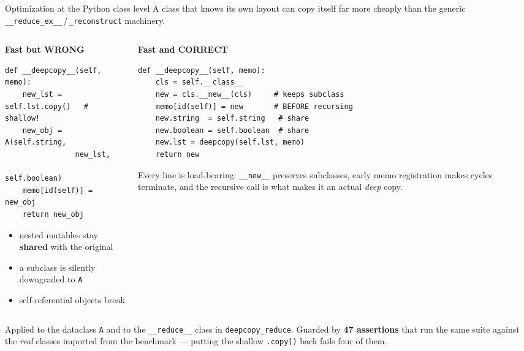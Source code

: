 \documentclass[aspectratio=169,11pt]{beamer}
\begin{document}
\begin{frame}[fragile]{Optimization at the Python class level}
\small
A class that knows its own layout can copy itself far more cheaply than the
generic \texttt{\_\_reduce\_ex\_\_}\,/\,\texttt{\_reconstruct} machinery.
\vspace{2pt}
\begin{columns}[T]
\begin{column}{0.48\textwidth}
\centering\footnotesize\textcolor{bad}{\textbf{Fast but WRONG}}
\begin{lstlisting}[style=py]
def __deepcopy__(self, memo):
    new_lst = self.lst.copy()   # shallow!
    new_obj = A(self.string,
                new_lst,
                self.boolean)
    memo[id(self)] = new_obj
    return new_obj
\end{lstlisting}
\scriptsize
\begin{itemize}\scriptsize
  \item nested mutables stay \textbf{shared} with the original
  \item a subclass is silently downgraded to \texttt{A}
  \item self-referential objects break
\end{itemize}
\end{column}
\begin{column}{0.50\textwidth}
\centering\footnotesize\textcolor{good}{\textbf{Fast and CORRECT}}
\begin{lstlisting}[style=py]
def __deepcopy__(self, memo):
    cls = self.__class__
    new = cls.__new__(cls)     # keeps subclass
    memo[id(self)] = new       # BEFORE recursing
    new.string  = self.string   # share
    new.boolean = self.boolean  # share
    new.lst = deepcopy(self.lst, memo)
    return new
\end{lstlisting}
\scriptsize
Every line is load-bearing: \texttt{\_\_new\_\_} preserves subclasses,
early memo registration makes cycles terminate, and the recursive call is
what makes it an actual \emph{deep} copy.
\end{column}
\end{columns}
\vspace{3pt}
\footnotesize
Applied to the dataclass \texttt{A} and to the \texttt{\_\_reduce\_\_} class in
\texttt{deepcopy\_reduce}. Guarded by \textbf{47 assertions} that run the same
suite against the \emph{real} classes imported from the benchmark --- putting
the shallow \texttt{.copy()} back fails four of them.
\end{frame}
\end{document}
